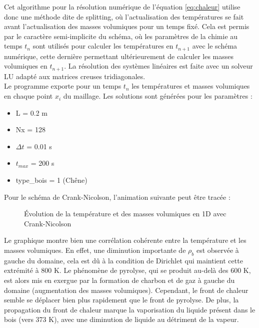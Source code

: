\documentclass[a4paper,11pt]{article}
\begin{document}
Cet algorithme pour la résolution numérique de l'équation \eqref{eq:chaleur} utilise donc une méthode dite de splitting, où l'actualisation des températures se fait avant l'actualisation des masses volumiques pour un temps fixé. Cela est permis par le caractère semi-implicite du schéma, où les paramètres de la chimie au temps $t_n$ sont utilisés pour calculer les températures en $t_{n+1}$ avec le schéma numérique, cette dernière permettant ultérieurement de calculer les masses volumiques en $t_{n+1}$. La résolution des systèmes linéaires est faite avec un solveur LU adapté aux matrices creuses tridiagonales.\\

Le programme exporte pour un temps $t_n$ les températures et masses volumiques en chaque point $x_i$ du maillage. Les solutions sont générées pour les paramètres :
\begin{itemize}
    \item L = 0.2 m
    \item Nx = 128
    \item $\Delta t$ = 0.01 s
    \item $t_{max}$ = 200 s
    \item type\_bois = 1 (Chêne)
\end{itemize}

Pour le schéma de Crank-Nicolson, l'animation suivante peut être tracée :

\begin{figure}[H]
    \caption{\centering Évolution de la température et des masses volumiques en 1D avec Crank-Nicolson}
\end{figure}

Le graphique montre bien une corrélation cohérente entre la température et les masses volumiques. En effet, une diminution importante de $\rho_b$ est observée à gauche du domaine, cela est dû à la condition de Dirichlet qui maintient cette extrémité à 800 K. Le phénomène de pyrolyse, qui se produit au-delà des 600 K, est alors mis en exergue par la formation de charbon et de gaz à gauche du domaine (augmentation des masses volumiques). Cependant, le front de chaleur semble se déplacer bien plus rapidement que le front de pyrolyse. De plus, la propagation du front de chaleur marque la vaporisation du liquide présent dans le bois (vers 373 K), avec une diminution de liquide au détriment de la vapeur. \\
\end{document}
